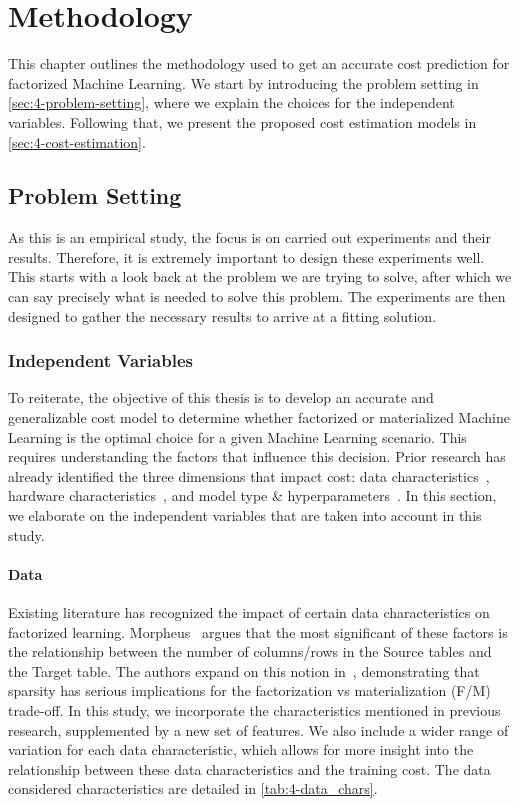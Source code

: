 
\chapter{Methodology}

\label{chapter:methodology}

This chapter outlines the methodology used to get an accurate cost prediction for factorized Machine Learning. We start by introducing the problem setting in \autoref{sec:4-problem-setting}, where we explain the choices for the independent variables. Following that, we present the proposed cost estimation models in \autoref{sec:4-cost-estimation}.

\section{Problem Setting}
\label{sec:4-problem-setting}

As this is an empirical study, the focus is on carried out experiments and their results. Therefore, it is extremely important to design these experiments well. This starts with a look back at the problem we are trying to solve, after which we can say precisely what is needed to solve this problem. The experiments are then designed to gather the necessary results to arrive at a fitting solution.

\subsection{Independent Variables}
To reiterate, the objective of this thesis is to develop an accurate and generalizable cost model to determine whether factorized or materialized Machine Learning is the optimal choice for a given Machine Learning scenario. This requires understanding the factors that influence this decision. Prior research has already identified the three dimensions that impact cost: data characteristics~\cite{morpheus, amalur,amalur_tkde24}, hardware characteristics~\cite{orion_learning_gen_lin_models}, and model type \& hyperparameters~\cite{amalur,amalur_tkde24}. In this section, we elaborate on the independent variables that are taken into account in this study.

\subsubsection{Data}
Existing literature has recognized the impact of certain data characteristics on factorized learning. Morpheus~\cite{morpheus} argues that the most significant of these factors is the relationship between the number of columns/rows in the Source tables and the Target table. The authors expand on this notion in~\cite{MorpheusFI}, demonstrating that sparsity has serious implications for the factorization vs materialization (F/M) trade-off. In this study, we incorporate the characteristics mentioned in previous research, supplemented by a new set of features. We also include a wider range of variation for each data characteristic, which allows for more insight into the relationship between these data characteristics and the training cost. The data considered characteristics are detailed in \autoref{tab:4-data_chars}.

